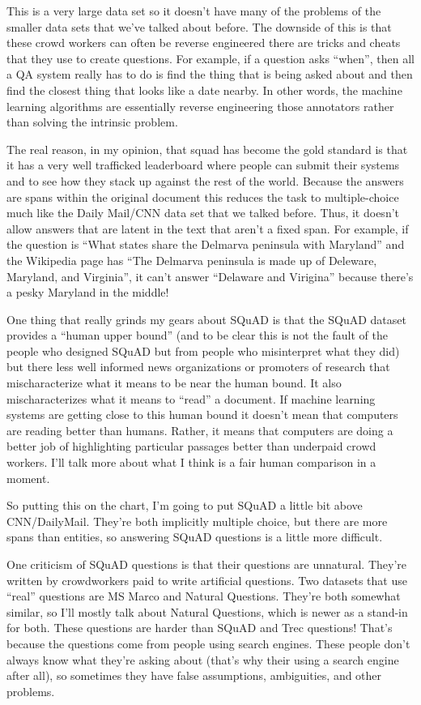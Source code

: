 This is a very large data set so it doesn't have many of the problems of the smaller data sets that we've talked about before. The downside of this is that these crowd workers can often be reverse engineered there are tricks and cheats that they use to create questions.  For example, if a question asks “when”, then all a QA system really has to do is find the thing that is being asked about and then find the closest thing that looks like a date nearby.  In other words, the machine learning algorithms are essentially reverse engineering those annotators rather than solving the intrinsic problem.

The real reason, in my opinion, that squad has become the gold standard is that it has a very well trafficked leaderboard where people can submit their systems and to see how they stack up against the rest of the world.  Because the answers are spans within the original document this reduces the task to multiple-choice much like the Daily Mail/CNN data set that we talked before.  Thus, it doesn't allow answers that are latent in the text that aren’t a fixed span.  For example, if the question is “What states share the Delmarva peninsula with Maryland” and the Wikipedia page has “The Delmarva peninsula is made up of Deleware, Maryland, and Virginia”, it can’t answer “Delaware and Virigina” because there’s a pesky Maryland in the middle!

One thing that really grinds my gears about SQuAD is that the SQuAD dataset provides a “human upper bound” (and to be clear this is not the fault of the people who designed SQuAD but from people who misinterpret what they did) but there less well informed news organizations or promoters of research that mischaracterize what it means to be near the human bound.  It also mischaracterizes what it means to “read” a document.  If machine learning systems are getting close to this human bound it doesn't mean that computers are reading better than humans.  Rather, it means that computers are doing a better job of highlighting particular passages better than underpaid crowd workers.  I’ll talk more about what I think is a fair human comparison in a moment.

So putting this on the chart, I’m going to put SQuAD a little bit above CNN/DailyMail.  They’re both implicitly multiple choice, but there are more spans than entities, so answering SQuAD questions is a little more difficult.

One criticism of SQuAD questions is that their questions are unnatural.  They’re written by crowdworkers paid to write artificial questions.  Two datasets that use “real” questions are MS Marco and Natural Questions.  They’re both somewhat similar, so I’ll mostly talk about Natural Questions, which is newer as a stand-in for both.  These questions are harder than SQuAD and Trec questions!  That’s because the questions come from people using search engines.  These people don’t always know what they’re asking about (that’s why their using a search engine after all), so sometimes they have false assumptions, ambiguities, and other problems.  

